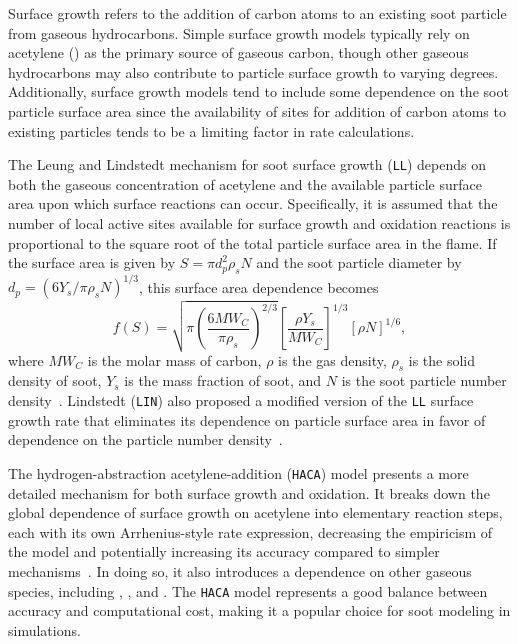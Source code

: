 \documentclass[preprint,letterpaper]{elsarticle}
\begin{document}
Surface growth refers to the addition of carbon atoms to an existing soot particle from gaseous hydrocarbons. Simple surface growth models typically rely on acetylene () as the primary source of gaseous carbon, though other gaseous hydrocarbons may also contribute to particle surface growth to varying degrees. Additionally, surface growth models tend to include some dependence on the soot particle surface area since the availability of sites for addition of carbon atoms to existing particles tends to be a limiting factor in rate calculations.

The Leung and Lindstedt mechanism for soot surface growth (\texttt{LL}) depends on both the gaseous concentration of acetylene and the available particle surface area upon which surface reactions can occur. Specifically, it is assumed that the number of local active sites available for surface growth and oxidation reactions is proportional to the square root of the total particle surface area in the flame. If the surface area is given by $S=\pi d_p^2 \rho_s N$ and the soot particle diameter by $d_p=(6Y_{s}/\pi \rho_{s} N)^{1/3}$, this surface area dependence becomes
\begin{equation}
    \label{e:surface_area}
    f(S) = \sqrt{\pi \left( \frac{6MW_C}{\pi \rho_{s}} \right) ^{2/3}} \left[ \frac{\rho Y_{s}}{MW_C} \right]^{1/3} [\rho N]^{1/6},
\end{equation}
where $MW_C$ is the molar mass of carbon, $\rho$ is the gas density, $\rho_{s}$ is the solid density of soot, $Y_{s}$ is the mass fraction of soot, and $N$ is the soot particle number density~\cite{Leung_1991}. Lindstedt (\texttt{LIN}) also proposed a modified version of the \texttt{LL} surface growth rate that eliminates its dependence on particle surface area in favor of dependence on the particle number density~\cite{Lindstedt_1994}.

The hydrogen-abstraction acetylene-addition (\texttt{HACA}) model presents a more detailed mechanism for both surface growth and oxidation. It breaks down the global dependence of surface growth on acetylene into elementary reaction steps, each with its own Arrhenius-style rate expression, decreasing the empiricism of the model and potentially increasing its accuracy compared to simpler mechanisms~\cite{Appel_2000}. In doing so, it also introduces a dependence on other gaseous species, including , , and . The \texttt{HACA} model represents a good balance between accuracy and computational cost, making it a popular choice for soot modeling in simulations.
\end{document}
